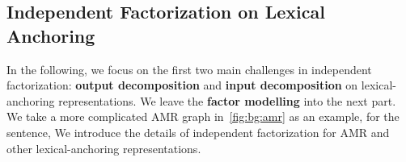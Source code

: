\subsection{Independent Factorization on Lexical Anchoring}
\label{ssec:lex-phr:lex-factorization-analysis}
In the following, we focus on the first two main challenges in
independent factorization: \textbf{output decomposition} and
\textbf{input decomposition} on lexical-anchoring representations. We leave the
\textbf{factor modelling} into the next part.  We take a more
complicated AMR graph in~\autoref{fig:bg:amr} as an example, for the
sentence,  We introduce the details of
independent factorization for AMR and other lexical-anchoring
representations.


